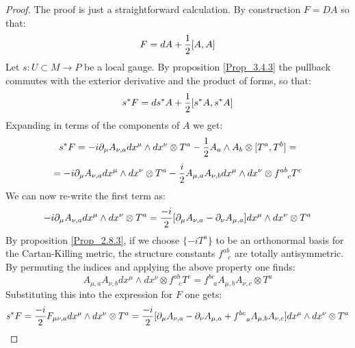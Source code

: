 \documentclass[12pt,a4paper]{report}
\theoremstyle{definition}
\theoremstyle{Theorem}
\theoremstyle{definition}
\theoremstyle{definition}
\begin{document}
	\begin{proof}
		The proof is just a straightforward calculation. By construction $F=DA$ so that:
		$$F=dA+{1\over 2}[A,A]$$
		Let $s:U\subset M\rightarrow P$ be a local gauge. By proposition \ref{Prop_3.4.3} the pullback commutes with the exterior derivative and the product of forms, so that:
		$$s^*F=ds^*A+{1\over 2}[s^*A,s^*A]$$
		Expanding in terms of the components of $A$ we get:
		$$s^*F=-i\partial_\mu A_{\nu,a}dx^\mu\wedge dx^\nu\otimes T^a-{1\over 2}A_a\wedge A_b\otimes [T^a,T^b]=$$
		$$=-i\partial_\mu A_{\nu,a}dx^\mu\wedge dx^\nu\otimes T^a-{i\over 2}A_{\mu,a}A_{\nu,b}dx^\mu\wedge dx^\nu \otimes f^{ab}_{\hspace{9pt}c}T^c$$
		We can now re-write the first term as:
		$$-i\partial_\mu A_{\nu,a}dx^\mu\wedge dx^\nu\otimes T^a={-i\over 2}[\partial_\mu A_{\nu,a}-\partial_\nu A_{\mu,a}]dx^\mu\wedge dx^\nu\otimes T^a$$
		By proposition \ref{Prop_2.8.3}, if we choose $\{-iT^a\}$ to be an orthonormal basis for the Cartan-Killing metric, the structure constants $f^{ab}_{\hspace{9pt}c}$ are totally antisymmetric. By permuting the indices and applying the above property one finds:
		$$A_{\mu,a}A_{\nu,b}dx^\mu\wedge dx^\nu \otimes f^{ab}_{\hspace{9pt}c}T^c=f^{bc}_{\hspace{9pt}a}A_{\mu,b}A_{\nu,c}\otimes T^a$$
		Substituting this into the expression for $F$ one gets:
		$$s^*F={-i\over 2}F_{\mu\nu,a}dx^\mu\wedge dx^\nu\otimes T^a={-i\over 2}[\partial_{\mu}A_{\nu,a}-\partial_{\nu}A_{\mu,a}+f^{bc}_{\hspace{9pt}a}A_{\mu,b}A_{\nu,c}]dx^\mu\wedge dx^\nu \otimes T^a$$
	\end{proof}
\end{document}
